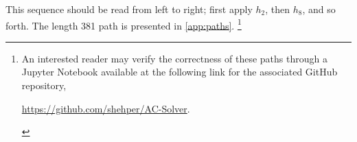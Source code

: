 This sequence should be read from left to right; first apply $h_2$, then $h_8$, and so forth. The length 381 path is presented in \autoref{app:paths}. 
\footnote{An interested reader may verify the correctness of these paths through a Jupyter Notebook available at the following link for the associated GitHub repository,
\begin{center}
\href{https://github.com/shehper/AC-Solver}{https://github.com/shehper/AC-Solver}.
\end{center}
}
